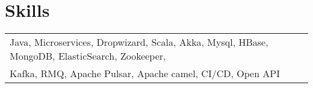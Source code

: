 \documentclass[a4paper,12pt]{article}
\begin{document}
\section{Skills}
\begin{tabularx}{\linewidth}{@{}l X@{}}
Java, Microservices, Dropwizard, Scala, Akka, Mysql, HBase, MongoDB, ElasticSearch, Zookeeper,\\ Kafka, RMQ, Apache Pulsar, Apache camel, CI/CD, Open API
\end{tabularx}

\vfill
{}
\end{document}

